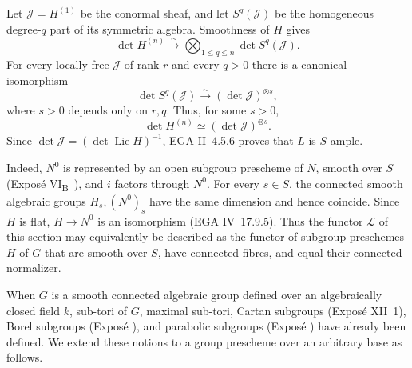 Let \(\mathcal J=H^{(1)}\) be the conormal sheaf, and let
\(S^q(\mathcal J)\) be the homogeneous degree-\(q\) part of its
symmetric algebra. Smoothness of \(H\) gives
\[
  \det H^{(n)}
  \xrightarrow{\sim}
  \bigotimes_{1\leq q\leq n}\det S^q(\mathcal J).
\]
For every locally free \(\mathcal J\) of rank \(r\) and every \(q>0\)
there is a canonical isomorphism
\[
  \det S^q(\mathcal J)
  \xrightarrow{\sim}
  (\det\mathcal J)^{\otimes s},
\]
where \(s>0\) depends only on \(r,q\). Thus, for some \(s>0\),
\[
  \det H^{(n)}\simeq(\det\mathcal J)^{\otimes s}.
\]
Since \(\det\mathcal J=(\det\operatorname{Lie}H)^{-1}\), EGA
II~4.5.6 proves that \(L\) is \(S\)-ample.


Indeed, \(N^0\) is represented by an open subgroup prescheme of \(N\),
smooth over \(S\) (Exposé VI\textsubscript{B}~), and \(i\)
factors through \(N^0\). For every \(s\in S\), the connected smooth
algebraic groups \(H_s,(N^0)_s\) have the same dimension and hence
coincide. Since \(H\) is flat, \(H\to N^0\) is an isomorphism
(EGA IV~17.9.5). Thus the functor \(\mathcal L\) of this section may
equivalently be described as the functor of subgroup preschemes
\(H\) of \(G\) that are smooth over \(S\), have connected fibres,
and equal their connected normalizer.




When \(G\) is a smooth connected algebraic group defined over an
algebraically closed field \(k\), sub-tori of \(G\), maximal
sub-tori, Cartan subgroups (Exposé XII~1), Borel subgroups (Exposé
), and parabolic subgroups (Exposé ) have already
been defined. We extend these notions to a group prescheme over an
arbitrary base as follows.


